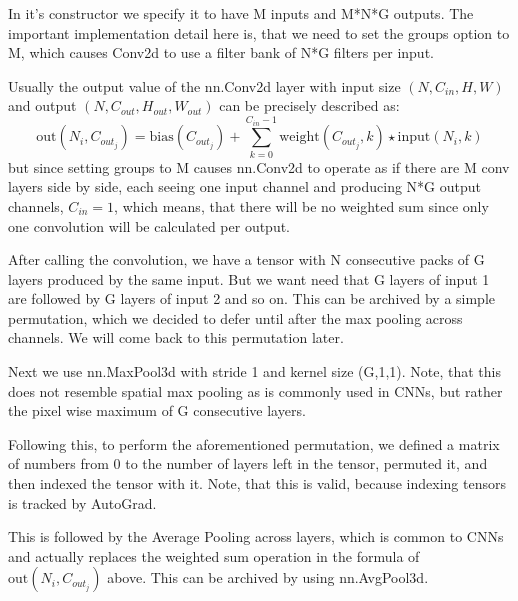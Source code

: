 \documentclass{llncs}
\begin{document}
In it's constructor we specify it to have M inputs and M*N*G outputs. The important implementation detail here is, that we need to set the groups option to M, which causes Conv2d to use a filter bank of N*G filters per input.

Usually the output value of the nn.Conv2d layer with input size $(N, C_{in}, H, W)$ and output $(N, C_{out}, H_{out}, W_{out})$ can be precisely described as:
\begin{equation*}
\text{out}(N_i, C_{out_j}) = \text{bias}(C_{out_j}) +
\sum_{k = 0}^{C_{in} - 1} \text{weight}(C_{out_j}, k) \star \text{input}(N_i, k)
\end{equation*}
but since setting groups to M causes nn.Conv2d to operate as if there are M conv layers side by side, each seeing one input channel and producing N*G output channels, $C_{in} = 1$, which means, that there will be no weighted sum since only one convolution will be calculated per output.

After calling the convolution, we have a tensor with N consecutive packs of G layers produced by the same input. But we want need that G layers of input 1 are followed by G layers of input 2 and so on. This can be archived by a simple permutation, which we decided to defer until after the max pooling across channels. We will come back to this permutation later.

Next we use nn.MaxPool3d with stride 1 and kernel size (G,1,1). Note, that this does not resemble spatial max pooling as is commonly used in CNNs, but rather the pixel wise maximum of G consecutive layers.

Following this, to perform the aforementioned permutation, we defined a matrix of numbers from 0 to the number of layers left in the tensor, permuted it, and then indexed the tensor with it. Note, that this is valid, because indexing tensors is tracked by AutoGrad.

This is followed by the Average Pooling across layers, which is common to CNNs and actually replaces the weighted sum operation in the formula of $\text{out}(N_i, C_{out_j})$ above. This can be archived by using nn.AvgPool3d.
\end{document}
